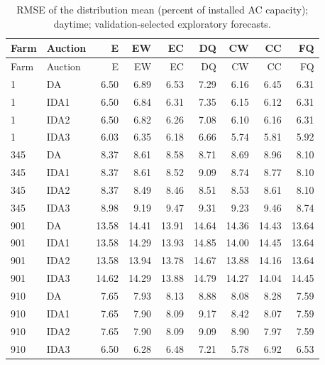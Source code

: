 \documentclass[11pt,a4paper]{article}
\begin{document}
\begin{longtable}{llrrrrrrr}
\caption{RMSE of the distribution mean (percent of installed AC capacity); daytime; validation-selected exploratory forecasts.}\\
\toprule Farm & Auction & E & EW & EC & DQ & CW & CC & FQ \\
\midrule\endfirsthead
\toprule Farm & Auction & E & EW & EC & DQ & CW & CC & FQ \\
\midrule\endhead
1 & DA & 6.50 & 6.89 & 6.53 & 7.29 & 6.16 & 6.45 & 6.31 \\
1 & IDA1 & 6.50 & 6.84 & 6.31 & 7.35 & 6.15 & 6.12 & 6.31 \\
1 & IDA2 & 6.50 & 6.82 & 6.26 & 7.08 & 6.10 & 6.16 & 6.31 \\
1 & IDA3 & 6.03 & 6.35 & 6.18 & 6.66 & 5.74 & 5.81 & 5.92 \\
\midrule
345 & DA & 8.37 & 8.61 & 8.58 & 8.71 & 8.69 & 8.96 & 8.10 \\
345 & IDA1 & 8.37 & 8.61 & 8.52 & 9.09 & 8.74 & 8.77 & 8.10 \\
345 & IDA2 & 8.37 & 8.49 & 8.46 & 8.51 & 8.53 & 8.61 & 8.10 \\
345 & IDA3 & 8.98 & 9.19 & 9.47 & 9.31 & 9.23 & 9.46 & 8.74 \\
\midrule
901 & DA & 13.58 & 14.41 & 13.91 & 14.64 & 14.36 & 14.43 & 13.64 \\
901 & IDA1 & 13.58 & 14.29 & 13.93 & 14.85 & 14.00 & 14.45 & 13.64 \\
901 & IDA2 & 13.58 & 13.94 & 13.78 & 14.67 & 13.88 & 14.16 & 13.64 \\
901 & IDA3 & 14.62 & 14.29 & 13.88 & 14.79 & 14.27 & 14.04 & 14.45 \\
\midrule
910 & DA & 7.65 & 7.93 & 8.13 & 8.88 & 8.08 & 8.28 & 7.59 \\
910 & IDA1 & 7.65 & 7.90 & 8.09 & 9.17 & 8.42 & 8.07 & 7.59 \\
910 & IDA2 & 7.65 & 7.90 & 8.09 & 9.09 & 8.90 & 7.97 & 7.59 \\
910 & IDA3 & 6.50 & 6.28 & 6.48 & 7.21 & 5.78 & 6.92 & 6.53 \\
\midrule
\bottomrule\end{longtable}
\normalsize
\small
\end{document}
